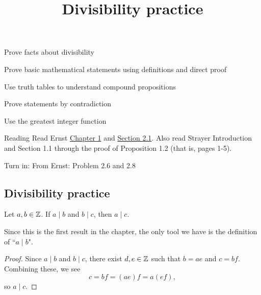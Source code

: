 \documentclass{ximera}
\title{Divisibility practice}
\begin{document}
\begin{abstract}
\end{abstract}
\maketitle


\begin{obj}
  \item Prove facts about divisibility
  \item Prove basic mathematical statements using definitions and direct proof
  \item Use truth tables to understand compound propositions
  \item Prove statements by contradiction
  \item Use the greatest integer function
\end{obj}
 

\begin{instructorNotes}
  \begin{pre}
    \item[Reading]  Read Ernst  \href{https://danaernst.com/IBL-IntroToProof/pretext/chap_intro.html}{Chapter 1} and \href{https://danaernst.com/IBL-IntroToProof/pretext/sec_baby_number_theory.html}{Section 2.1}. Also read Strayer Introduction and Section 1.1 through the proof of Proposition 1.2 (that is, pages 1-5).
  
    \item[Turn in:] From Ernst: Problem 2.6 and 2.8
  \end{pre}
\end{instructorNotes}




 

\subsection{Divisibility practice}

\begin{proposition}
Let $a,b\in\mathbb Z$. If $a\mid b$ and $b \mid c$, then $a\mid c$.
\end{proposition}

Since this is the first result in the chapter, the only tool we have is the definition of ``$a\mid b$". 

\begin{proof}
  Since $a\mid b$ and $b \mid c$, there exist $d,e\in\mathbb Z$ such that $b=ae$ and $c=bf$. Combining these, we see \[c=bf=(ae)f=a(ef),\] so $a\mid c$.
\end{proof}
\end{document}

